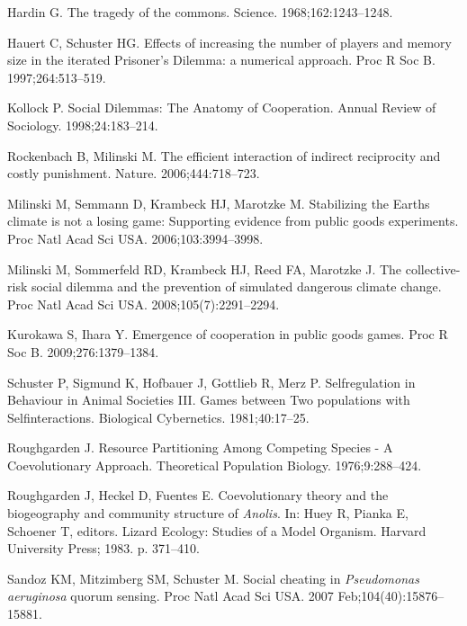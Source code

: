 \documentclass[aps,pre,amsfonts,floatfix, onecolumn,showkeys]{revtex4-1}
\begin{document}
\begin{thebibliography}{10}
Hardin G.
\newblock The tragedy of the commons.
\newblock Science. 1968;162:1243--1248.

Hauert C, Schuster HG.
\newblock Effects of increasing the number of players and memory size in the
  iterated Prisoner's Dilemma: a numerical approach.
\newblock Proc R Soc B. 1997;264:513--519.

Kollock P.
\newblock Social Dilemmas: The Anatomy of Cooperation.
\newblock Annual Review of Sociology. 1998;24:183--214.

Rockenbach B, Milinski M.
\newblock The efficient interaction of indirect reciprocity and costly
  punishment.
\newblock Nature. 2006;444:718--723.

Milinski M, Semmann D, Krambeck HJ, Marotzke M.
\newblock Stabilizing the Earths climate is not a losing game: Supporting
  evidence from public goods experiments.
\newblock Proc Natl Acad Sci USA. 2006;103:3994--3998.

Milinski M, Sommerfeld RD, Krambeck HJ, Reed FA, Marotzke J.
\newblock The collective-risk social dilemma and the prevention of simulated
  dangerous climate change.
\newblock Proc Natl Acad Sci USA. 2008;105(7):2291--2294.

Kurokawa S, Ihara Y.
\newblock Emergence of cooperation in public goods games.
\newblock Proc R Soc B. 2009;276:1379--1384.

Schuster P, Sigmund K, Hofbauer J, Gottlieb R, Merz P.
\newblock Selfregulation in Behaviour in Animal Societies III. Games between
  Two populations with Selfinteractions.
\newblock Biological Cybernetics. 1981;40:17--25.

Roughgarden J.
\newblock Resource Partitioning Among Competing Species - A Coevolutionary
  Approach.
\newblock Theoretical Population Biology. 1976;9:288--424.

Roughgarden J, Heckel D, Fuentes E.
\newblock Coevolutionary theory and the biogeography and community structure of
  {\it{Anolis}}.
\newblock In: Huey R, Pianka E, Schoener T, editors. Lizard Ecology: Studies of
  a Model Organism. Harvard University Press; 1983. p. 371--410.

Sandoz KM, Mitzimberg SM, Schuster M.
\newblock Social cheating in \emph{Pseudomonas aeruginosa} quorum sensing.
\newblock Proc Natl Acad Sci USA. 2007 Feb;104(40):15876--15881.


\end{thebibliography}
\end{document}
